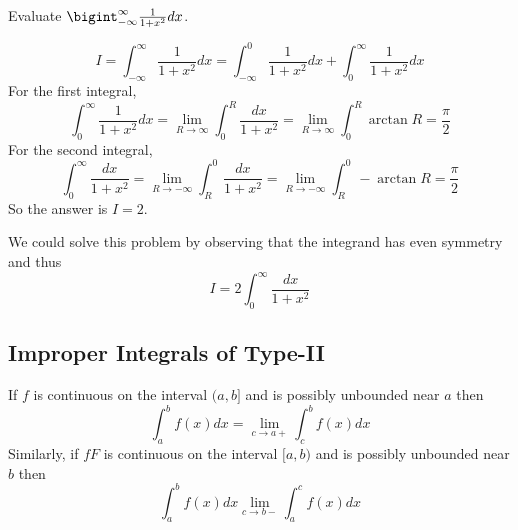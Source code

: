 \documentclass[../calc1-main.tex]{subfiles}
\begin{document}
\begin{example}
	Evaluate $\bigint_{-\infty}^{\infty} \frac{1}{1+x^2} dx$.
\end{example}
\begin{minipage}{0.5\textwidth}
\begin{solution}
	\[
		I = 
		\int_{-\infty}^{\infty} \frac{1}{1+x^2} dx =
		\int_{-\infty}^0 \frac{1}{1+x^2} dx + \int_0^{\infty} \frac{1}{1+x^2} dx
	\]
	For the first integral,
	\[
		\int_0^{\infty} \frac{1}{1+x^2} dx = 
		\lim_{R \to \infty}\int_0^R \frac{dx}{1+x^2} = 
		\lim_{R \to \infty}\int_0^R \arctan R = 
		\frac{\pi}{2}
	\]
	For the second integral,
	\[
		\int_0^{\infty} \frac{dx}{1+x^2} = 
		\lim_{R \to -\infty}\int_R^0 \frac{dx}{1+x^2} = 
		\lim_{R \to -\infty}\int_R^0 -\arctan R = 
		\frac{\pi}{2}
	\]
	So the answer is $I = 2$.

	We could solve this problem by observing that the integrand has even symmetry and thus
	\[
		I = 2\int_0^{\infty} \frac{dx}{1+x^2}
	\]
\end{solution}
\end{minipage}%
\begin{minipage}{0.5\textwidth}
  \begin{figure}[H]
  	\centering
  \end{figure}
\end{minipage}


\subsection*{Improper Integrals of Type-II}
\begin{definition}
	If $f$ is continuous on the interval $(a,b]$ and is possibly unbounded near $a$ then
	\[
		\int_a^b f(x) dx = \lim_{c \to a+} \int_c^b f(x) dx
	\]
	Similarly, if $fF$ is continuous on the interval $[a,b)$ and is possibly unbounded near $b$ then
	\[
		\int_a^b f(x) dx \lim_{c \to b-} \int_a^c f(x) dx
	\]
\end{definition}
\end{document}
